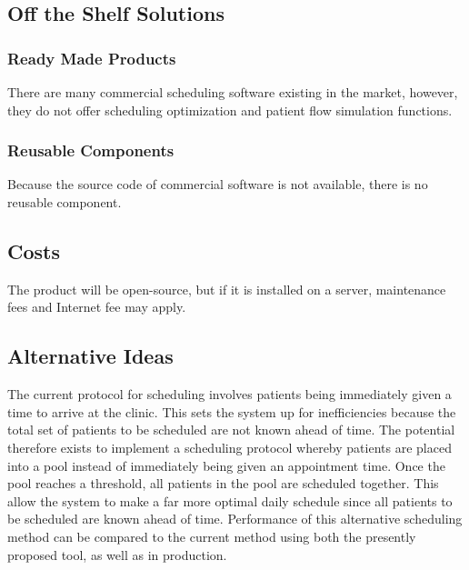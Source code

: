 \documentclass[12pt, titlepage]{article}
\begin{document}
\subsection{Off the Shelf Solutions}
\subsubsection{Ready Made Products}
There are many commercial scheduling software existing in the market, however, they do not offer scheduling optimization and patient flow simulation functions.

\subsubsection{Reusable Components}
Because the source code of commercial software is not available, there is no reusable component.

\subsection{Costs}
The product will be open-source, but if it is installed on a server, maintenance fees and Internet fee may apply.

\subsection{Alternative Ideas}
The current protocol for scheduling involves patients being immediately given a time to arrive at the clinic. This sets the system up for inefficiencies because the total set of patients to be scheduled are not known ahead of time. The potential therefore exists to implement a scheduling protocol whereby patients are placed into a pool instead of immediately being given an appointment time. Once the pool reaches a threshold, all patients in the pool are scheduled together. This allow the system to make a far more optimal daily schedule since all patients to be scheduled are known ahead of time. Performance of this alternative scheduling method can be compared to the current method using both the presently proposed tool, as well as in production.
\end{document}

